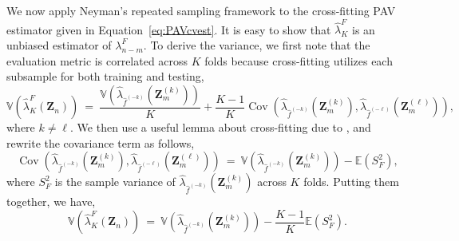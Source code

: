 \documentclass[USenglish,onecolumn]{article}
\DeclareMathOperator\Cov{Cov}
\newcommand\E{\mathbb{E}}
\newcommand\V{\mathbb{V}}
\newcommand\bZ{\bm{Z}}
\begin{document}
We now apply Neyman's repeated sampling framework to the cross-fitting
PAV estimator given in Equation~\eqref{eq:PAVcvest}.  It is easy to
show that $\hat\lambda_K^F$ is an unbiased estimator of
$\lambda^F_{n-m}$.  To derive the variance, we first note that the
evaluation metric is correlated across $K$ folds because cross-fitting
utilizes each subsample for both training and testing,
\begin{equation*}
  \V(\hat{\lambda}_K^F(\bZ_n)) \ = \
  \frac{\V(\hat{\lambda}_{\hat{f}^{(-k)}}(\bZ_m^{(k)}))}{K} + \frac{K-1}{K}
  \Cov( \hat{\lambda}_{\hat{f}^{(-k)}}(\bZ_m^{(k)}),  \hat{\lambda}_{\hat{f}^{(-\ell)}}(\bZ_m^{(\ell)})),
\end{equation*}
where $k \ne \ell$.  We then use a useful lemma about cross-fitting
due to \cite{nadeau2003inference}, and rewrite the covariance term as
follows, 
\begin{equation*}
\Cov( \hat{\lambda}_{\hat{f}^{(-k)}}(\bZ_m^{(k)}),
\hat{\lambda}_{\hat{f}^{(-\ell)}}(\bZ_m^{(\ell)})) \ = \
\V(\hat{\lambda}_{\hat{f}^{(-k)}}(\bZ_m^{(k)})) -  \E(S_F^2), 
\end{equation*}
where $S^2_F$ is the sample variance of
$\hat{\lambda}_{\hat{f}^{(-k)}}(\bZ_m^{(k)})$ across $K$ folds.
Putting them together, we have,
\begin{equation}
  \V(\hat{\lambda}_K^F(\bZ_n)) \ = \
  \V(\hat{\lambda}_{\hat{f}^{(-k)}}(\bZ_m^{(k)})) -\frac{K-1}{K}
  \E(S_F^2). \label{eq:lambdaFvar}
\end{equation}  
\end{document}
